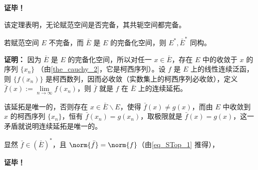 \textbf{证毕！}

该定理表明，无论赋范空间是否完备，其共轭空间都完备。

\begin{theorem}{}
若赋范空间 $E$ 不完备，而 $\bar{E}$ 是 $E$ 的完备化空间，则 $E^*,\bar{E}^*$ 同构。
\end{theorem}

\textbf{证明：} 因为 $\bar{E}$ 是 $E$ 的完备化空间，所以对任一 $x\in \bar{E}$，存在 $E$ 中的收敛于 $x$ 的序列 $\{x_n\}$ （由\autoref{the_cauchy_2}，它是柯西序列）。设 $f$ 是 $E$ 上的线性连续泛函，则 $\{f(x_n)\}$ 是柯西数列，因而必收敛（实数集上的柯西序列必收敛），定义 $\bar f(x):=\lim\limits_{n\rightarrow\infty}f(x_n)$，则 $\bar f$ 就是 $f$ 在 $\bar E$ 上的连续延拓。

该延拓是唯一的，否则存在 $x\in \bar E\backslash E$，使得 $\bar f(x)\neq g(x)$，而由 $E$ 中收敛到 $x$ 的柯西序列 $\{x_n\}$，恒有 $\bar f(x_n)=g(x_n)$，取极限就是 $\bar f(x)=g(x)$，这一矛盾就说明连续延拓是唯一的。

显然 $\bar f\in(\bar E)^*$，且 $\norm{\bar f}=\norm{f}$（由\autoref{eq_STop_1} 推得），

\textbf{证毕！}



